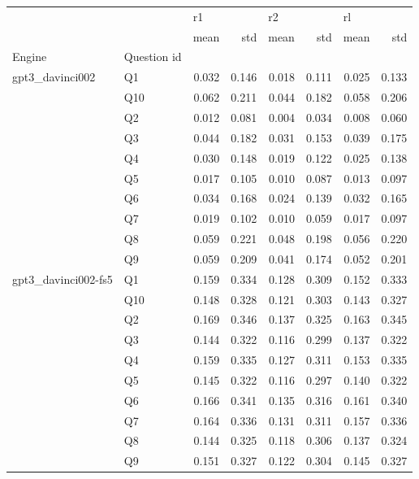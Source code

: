\begin{tabular}{llrrrrrr}
\toprule
                &   & \multicolumn{2}{l}{r1} & \multicolumn{2}{l}{r2} & \multicolumn{2}{l}{rl} \\
                &   &  mean &   std &  mean &   std &  mean &   std \\
Engine & Question id &       &       &       &       &       &       \\
\midrule
gpt3\_davinci002 & Q1 & 0.032 & 0.146 & 0.018 & 0.111 & 0.025 & 0.133 \\
                & Q10 & 0.062 & 0.211 & 0.044 & 0.182 & 0.058 & 0.206 \\
                & Q2 & 0.012 & 0.081 & 0.004 & 0.034 & 0.008 & 0.060 \\
                & Q3 & 0.044 & 0.182 & 0.031 & 0.153 & 0.039 & 0.175 \\
                & Q4 & 0.030 & 0.148 & 0.019 & 0.122 & 0.025 & 0.138 \\
                & Q5 & 0.017 & 0.105 & 0.010 & 0.087 & 0.013 & 0.097 \\
                & Q6 & 0.034 & 0.168 & 0.024 & 0.139 & 0.032 & 0.165 \\
                & Q7 & 0.019 & 0.102 & 0.010 & 0.059 & 0.017 & 0.097 \\
                & Q8 & 0.059 & 0.221 & 0.048 & 0.198 & 0.056 & 0.220 \\
                & Q9 & 0.059 & 0.209 & 0.041 & 0.174 & 0.052 & 0.201 \\
gpt3\_davinci002-fs5 & Q1 & 0.159 & 0.334 & 0.128 & 0.309 & 0.152 & 0.333 \\
                & Q10 & 0.148 & 0.328 & 0.121 & 0.303 & 0.143 & 0.327 \\
                & Q2 & 0.169 & 0.346 & 0.137 & 0.325 & 0.163 & 0.345 \\
                & Q3 & 0.144 & 0.322 & 0.116 & 0.299 & 0.137 & 0.322 \\
                & Q4 & 0.159 & 0.335 & 0.127 & 0.311 & 0.153 & 0.335 \\
                & Q5 & 0.145 & 0.322 & 0.116 & 0.297 & 0.140 & 0.322 \\
                & Q6 & 0.166 & 0.341 & 0.135 & 0.316 & 0.161 & 0.340 \\
                & Q7 & 0.164 & 0.336 & 0.131 & 0.311 & 0.157 & 0.336 \\
                & Q8 & 0.144 & 0.325 & 0.118 & 0.306 & 0.137 & 0.324 \\
                & Q9 & 0.151 & 0.327 & 0.122 & 0.304 & 0.145 & 0.327 \\

\end{tabular}
